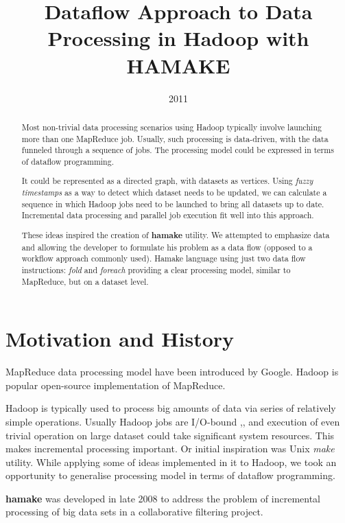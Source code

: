 \documentclass[10pt,conference,letterpaper]{IEEEtran}
\title{Dataflow Approach to Data Processing in Hadoop with HAMAKE}
\author{\IEEEauthorblockN{Vadim Zaliva}
\IEEEauthorblockA{Codeminders\\
Email: lord@crocodile.org} \and \IEEEauthorblockN{Vladimir Orlov}
\IEEEauthorblockA{Codeminders\\
Email: vorl@codeminders.com}}
\date{2011}
\begin{document}
\lstset{language=XML,basicstyle=\tiny,markfirstintag=true}

\maketitle

\begin{abstract}
  Most non-trivial data processing scenarios using Hadoop typically
  involve launching more than one MapReduce job. Usually, such
  processing is data-driven, with the data funneled through a sequence
  of jobs. The processing model could be expressed in terms of
  dataflow programming.
  
  It could be represented as a directed graph, with datasets as
  vertices. Using \textit{fuzzy timestamps} as a way to detect which
  dataset needs to be updated, we can calculate a sequence in which
  Hadoop jobs need to be launched to bring all datasets up to
  date. Incremental data processing and parallel job execution fit
  well into this approach.

  These ideas inspired the creation of \textbf{hamake} utility. We
  attempted to emphasize data and allowing the developer to formulate
  his problem as a data flow (opposed to a workflow approach commonly
  used). Hamake language using just two data flow instructions:
  \emph{fold} and \emph{foreach} providing a clear processing model,
  similar to MapReduce, but on a dataset level.
\end{abstract}

\section{Motivation and History}

MapReduce data processing model have been introduced by
Google\cite{dean2008map}. Hadoop\cite{bialecki2005hadoop} is popular
open-source implementation of MapReduce.

Hadoop is typically used to process big amounts of data via series of
relatively simple operations. Usually Hadoop jobs are I/O-bound
\cite{hadoopattwitter},\cite{hs2010hadoopbench}, and execution of even
trivial operation on large dataset could take significant system
resources. This makes incremental processing important. Or initial
inspiration was Unix \emph{make} utility. While applying some of ideas
implemented in it to Hadoop, we took an opportunity to generalise
processing model in terms of dataflow programming.


\textbf{hamake} was developed in late 2008 to address the problem of
incremental processing of big data sets in a collaborative filtering
project.
\end{document}
